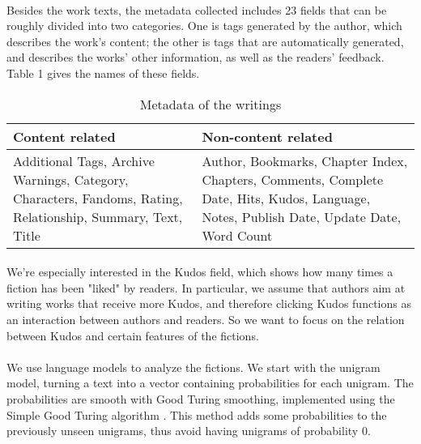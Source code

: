 \documentclass[11pt]{article} %
\begin{document}
\paragraph{} Besides the work texts, the metadata collected includes 23 fields that can be roughly divided into two categories. One is tags generated by the author, which describes the work’s content; the other is tags that are automatically generated, and describes the works’ other information, as well as the readers' feedback. Table 1 gives the names of these fields. 

\begin{table}[htp]
\caption{Metadata of the writings}
\begin{center}
\begin{tabular}{p{7cm}|p{7cm}}
  \hline			
 Content related & Non-content related\\\hline
Additional Tags, Archive Warnings, Category, Characters, Fandoms, Rating, Relationship, Summary, Text, Title
&  Author, Bookmarks, Chapter Index, Chapters, Comments, Complete Date, Hits, Kudos, Language, Notes, Publish Date, Update Date, Word Count\\
\hline
\end{tabular}
\end{center}
\label{default}
\end{table}%

\paragraph{} We're especially interested in the Kudos field, which shows how many times a fiction has been "liked" by readers. In particular, we assume that authors aim at writing works that receive more Kudos, and therefore clicking Kudos functions as an interaction between authors and readers. So we want to focus on the relation between Kudos and certain features of the fictions.

\paragraph{} We use language models to analyze the fictions. We start with the unigram model, turning a text into a vector containing probabilities for each unigram. The probabilities are smooth with Good Turing smoothing, implemented using the Simple Good Turing algorithm \cite{gales1995good}. This method adds some probabilities to the previously unseen unigrams, thus avoid having unigrams of probability 0.
\end{document}
